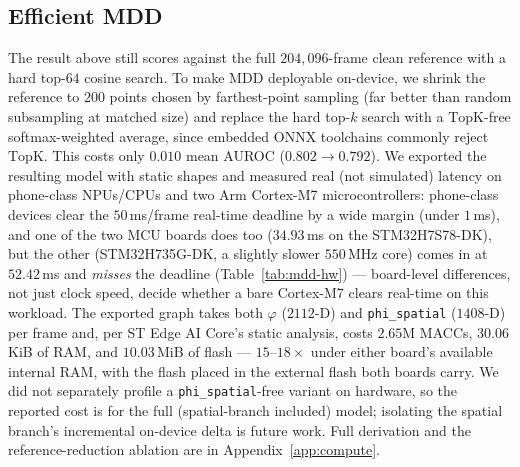 ﻿\documentclass{article} %
\theoremstyle{remark}
\begin{document}
\subsection{Efficient MDD}
\label{sec:efficient-mdd}
The result above still scores against the full $204{,}096$-frame clean reference with a hard
top-$64$ cosine search. To make MDD deployable on-device, we shrink the reference to $200$ points
chosen by farthest-point sampling (far better than random subsampling at matched size) and replace
the hard top-$k$ search with a $\mathrm{TopK}$-free softmax-weighted average, since embedded ONNX
toolchains commonly reject $\mathrm{TopK}$. This costs only $0.010$ mean AUROC ($0.802\to0.792$).
We exported the resulting model with static shapes and measured real (not simulated) latency on
phone-class NPUs/CPUs and two Arm Cortex-M7 microcontrollers: phone-class devices clear the
$50$\,ms/frame real-time deadline by a wide margin (under $1$\,ms), and one of the two MCU boards
does too ($34.93$\,ms on the STM32H7S78-DK), but the other (STM32H735G-DK, a slightly slower
$550$\,MHz core) comes in at $52.42$\,ms and \emph{misses} the deadline (Table~\ref{tab:mdd-hw}) ---
board-level differences, not just clock speed, decide whether a bare Cortex-M7 clears real-time on
this workload. The exported graph takes both $\varphi$ ($2112$-D) and \texttt{phi\_spatial}
($1408$-D) per frame and, per ST Edge AI Core's static analysis, costs $2.65$M MACCs, $30.06$\,KiB
of RAM, and $10.03$\,MiB of flash --- $15$--$18\times$ under either board's available internal RAM,
with the flash placed in the external flash both boards carry. We did not separately profile a
\texttt{phi\_spatial}-free variant on hardware, so the reported cost is for the full (spatial-branch
included) model; isolating the spatial branch's incremental on-device delta is future work. Full
derivation and the reference-reduction ablation are in Appendix~\ref{app:compute}.
\end{document}
